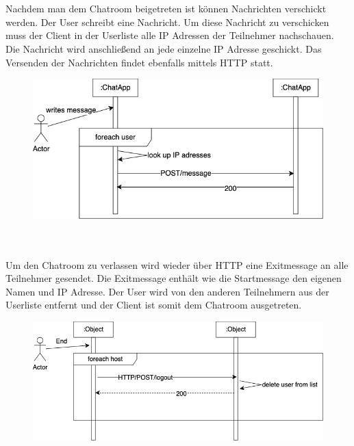 \\
\\
Nachdem man dem Chatroom beigetreten ist können Nachrichten verschickt werden. Der User schreibt eine Nachricht. 
Um diese Nachricht zu verschicken muss der Client in der Userliste alle IP Adressen der Teilnehmer nachschauen. Die Nachricht wird anschließend 
an jede einzelne IP Adresse geschickt. Das Versenden der Nachrichten findet ebenfalls mittels HTTP statt.
\begin{figure}[ht]
    \centering
    \includegraphics[scale=0.4]{Images/Conversation_Sequenzdiagramm.jpg}
\end{figure}
\\
\\
Um den Chatroom zu verlassen wird wieder über HTTP eine Exitmessage an alle Teilnehmer gesendet. Die Exitmessage enthält wie die Startmessage den eigenen Namen und IP Adresse.
Der User wird von den anderen Teilnehmern aus der Userliste entfernt und der Client ist somit dem Chatroom ausgetreten. 
\begin{figure}[ht]
    \centering
    \includegraphics[scale=0.4]{Images/Exit_Sequenzdiagramm.jpg}
\end{figure}







